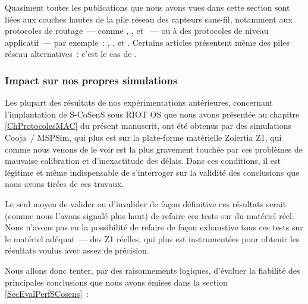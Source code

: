 Quasiment toutes les publications que nous avons vues dans cette section
sont liées aux couches hautes de la pile réseau des capteurs sans-fil,
notamment aux protocoles de routage~--- comme
\cite{Constrain-Routing-Trees-2014},
\cite{Co-RPL-2014}, \cite{IETF-Routing-WSN-2014}
et \cite{Trickle-L2-2014}~---
ou à des protocoles de niveau applicatif~--- par exemple~:
\cite{DINAS-2014}, \cite{Efficient-Distrib-Svc-Discovery-2014},
\cite{Visual-Sensor-Networks-2014} et \cite{Key-Mgmt-2015}.
Certains articles présentent même des piles réseau alternatives~:
c'est le cas de \cite{TinySDN-2014}.

\subsubsection*{Impact sur nos propres simulations}

Les plupart des résultats de nos expérimentations antérieures, concernant
l'implantation de S-CoSenS sous RIOT OS que nous avons présentée au
chapitre \ref{ChProtocolesMAC} du présent manuscrit, ont été obtenus par
des simulations Cooja~/ MSPSim, qui plus est sur la plate-forme matérielle
Zolertia Z1, qui comme nous venons de le voir est la plus gravement touchée
par ces problèmes de mauvaise calibration et d'inexactitude des délais.
Dans ces conditions, il est légitime et même indispensable de s'interroger
sur la validité des conclusions que nous avons tirées de ces travaux.

Le seul moyen de valider ou d'invalider de façon définitive ces résultats
serait (comme nous l'avons signalé plus haut) de refaire ces tests sur
du matériel réel. Nous n'avons pas eu la possibilité de refaire de façon
exhaustive tous ces tests sur le matériel adéquat~--- des 
Z1 réelles, qui plus est instrumentées pour obtenir les résultats voulus
avec assez de précision.

Nous allons donc tenter, par des raisonnements logiques, d'évaluer la
fiabilité des principales conclusions que nous avons émises dans la
section \vref{SecEvalPerfSCosens}~:

